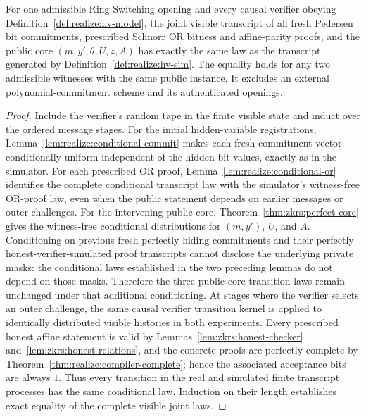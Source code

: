 \begin{theorem}\label{thm:realize:full-hvzk}
For one admissible Ring Switching opening and
every causal verifier obeying
Definition~\ref{def:realize:hv-model},
the joint visible transcript of all
fresh Pedersen bit commitments,
prescribed Schnorr OR bitness and
affine-parity proofs, and the public
core $(m,y',\theta,U,z,A)$ has exactly
the same law as the transcript generated by
Definition~\ref{def:realize:hv-sim}.
The equality holds for any two admissible
witnesses with the same public instance.
It excludes an external polynomial-commitment
scheme and its authenticated openings.
\end{theorem}
\begin{proof}
Include the verifier's random tape in the
finite visible state and induct over the
ordered message stages.
For the initial hidden-variable
registrations, Lemma~\ref{lem:realize:conditional-commit}
makes each fresh commitment vector
conditionally uniform independent of
the hidden bit values, exactly as in
the simulator.
For each prescribed OR proof,
Lemma~\ref{lem:realize:conditional-or}
identifies the complete conditional
transcript law with the simulator's
witness-free OR-proof law, even when
the public statement depends on
earlier messages or outer challenges.
For the intervening public core,
Theorem~\ref{thm:zkrs:perfect-core}
gives the witness-free conditional
distributions for $(m,y')$, $U$,
and $A$. Conditioning on previous
fresh perfectly hiding commitments and
their perfectly honest-verifier-simulated
proof transcripts cannot disclose
the underlying private masks: the
conditional laws established in the
two preceding lemmas do not depend on
those masks. Therefore the three
public-core transition laws remain
unchanged under that additional
conditioning.
At stages where the verifier selects
an outer challenge, the same causal
verifier transition kernel is applied
to identically distributed visible
histories in both experiments.
Every prescribed honest affine
statement is valid by
Lemmas~\ref{lem:zkrs:honest-checker}
and~\ref{lem:zkrs:honest-relations},
and the concrete proofs are perfectly
complete by
Theorem~\ref{thm:realize:compiler-complete};
hence the associated acceptance
bits are always $1$.
Thus every transition in the
real and simulated finite transcript
processes has the same conditional
law. Induction on their length
establishes exact equality of the
complete visible joint laws.
\end{proof}

